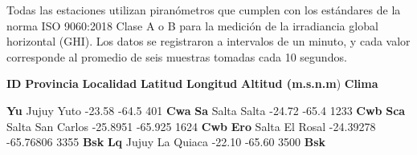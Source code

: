 \documentclass[letterpaper,12pt, twoside]{report}
\providecommand{\DIFdeltex}[1]{{\protect\color{red} \scriptsize #1}} %
\providecommand{\DIFdelFL}[1]{\DIFdel{#1}} %
\providecommand{\DIFdel}[1]{\texorpdfstring{\DIFdeltex{#1}}{}} %
\begin{document}
\DIFdel{Todas las estaciones utilizan piranómetros que cumplen con los estándares de la norma ISO 9060:2018 Clase A o B para la medición de la irradiancia global horizontal (GHI). Los datos se registraron a intervalos de un minuto, y cada valor corresponde al promedio de seis muestras tomadas cada 10 segundos.
}%

\DIFdelFL{\textbf{ID} }%
\DIFdelFL{\textbf{Provincia} }%
\DIFdelFL{\textbf{Localidad} }%
\DIFdelFL{\textbf{Latitud} }%
\DIFdelFL{\textbf{Longitud}}%
\DIFdelFL{\textbf{Altitud (m.s.n.m}) }%
\DIFdelFL{\textbf{Clima}}%

\DIFdelFL{\textbf{Yu} }%
\DIFdelFL{Jujuy }%
\DIFdelFL{Yuto }%
\DIFdelFL{-23.58 }%
\DIFdelFL{-64.5 }%
\DIFdelFL{401 }%
\DIFdelFL{\textbf{Cwa}}%
\DIFdelFL{\textbf{Sa} }%
\DIFdelFL{Salta }%
\DIFdelFL{Salta }%
\DIFdelFL{-24.72 }%
\DIFdelFL{-65.4 }%
\DIFdelFL{1233 }%
\DIFdelFL{\textbf{Cwb}}%
\DIFdelFL{\textbf{Sca} }%
\DIFdelFL{Salta }%
\DIFdelFL{San Carlos }%
\DIFdelFL{-25.8951 }%
\DIFdelFL{-65.925 }%
\DIFdelFL{1624 }%
\DIFdelFL{\textbf{Cwb}}%
\DIFdelFL{\textbf{Ero} }%
\DIFdelFL{Salta }%
\DIFdelFL{El Rosal }%
\DIFdelFL{-24.39278 }%
\DIFdelFL{-65.76806 }%
\DIFdelFL{3355}%
\DIFdelFL{\textbf{Bsk}}%
\DIFdelFL{\textbf{Lq} }%
\DIFdelFL{Jujuy }%
\DIFdelFL{La Quiaca }%
\DIFdelFL{-22.10 }%
\DIFdelFL{-65.60 }%
\DIFdelFL{3500}%
\DIFdelFL{\textbf{Bsk}}%
\end{document}
